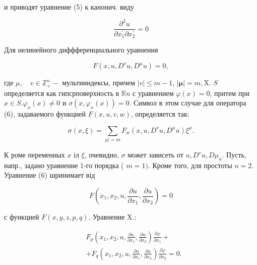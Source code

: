 \documentclass[10pt]{article}
\begin{document}
и приводят уравнение (5) к канонич. виду



\[

\frac{\partial^{2} u}{\partial x_{1}^{\prime} \partial x_{2}^{\prime}}=0

\]



Для нелинейного диффференциального уравнения



\[

F\left(x, u, D^{v} u, D^{\mu} u\right)=0,

\]



где $\mu, \quad v \in \mathbb{Z}_{+}^{n}-$ мультииндексы, причем $|v| \leqslant m-1$, $|\boldsymbol{\mu}|=m, \mathrm{X}$. $S$ определяется как гипсрповерхность в $\mathbb{R} n$ с уравнением $\varphi(x)=0$, притем при $x \in S . \varphi_{x}(x) \neq 0$ и $\sigma\left(x, \varphi_{x}(x)\right)=0$. Символ в этом случае для оператора (6), задаваемого функцией $F(x, u, v, w)$, определяется так:



\[

\sigma(x, \xi)=\sum_{\mu \mid=m} F_{w}\left(x, u, D^{v} u, D^{\mu} u\right) \xi^{\mu} .

\]



К роме переменных $x$ іл $\xi$, очевидно, $\sigma$ может зависеть от $u, D^{v} u, D \mu_{u}$. Пусть, напр., задано уравнение 1-го порядка ( $m=1)$. Кроме того, для простоты $n=2$. Уравнение (6) шринимает від



\[

F\left(x_{1}, x_{2}, u, \frac{\partial u}{\partial x_{1}}, \frac{\partial u}{\partial x_{2}}\right)=0

\]



с функцией $F(x, y, z, p, q)$. Уравнение $\mathrm{X} .:$



\[

\begin{aligned}

& F_{p}\left(x_{1}, x_{2}, u, \frac{\partial u}{\partial x_{1}}, \frac{\partial u}{\partial x_{2}}\right) \frac{\partial \varphi}{\partial x_{1}}+ \\

& +F_{q}\left(x_{1}, x_{2}, u, \frac{\partial u}{\partial x_{1}}, \frac{\partial u}{\partial x_{2}}\right) \frac{\partial \varphi}{\partial x_{2}}=0 .

\end{aligned}

\]
\end{document}

